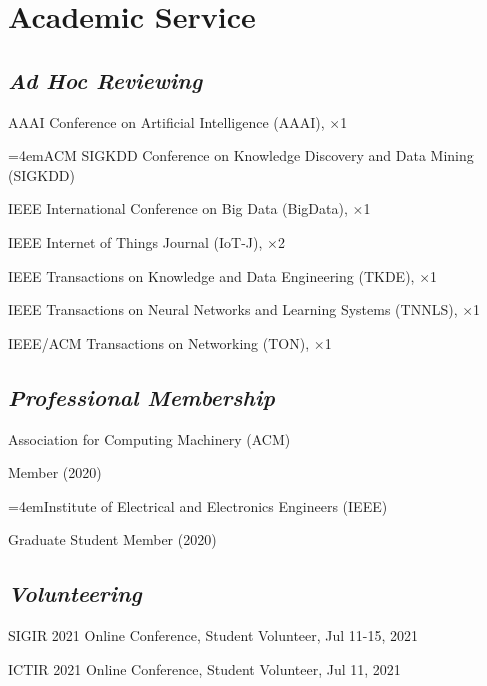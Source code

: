 
\vspace{-8pt}
\section*{Academic Service}
\vspace{-4pt}


\subsection*{\textnormal{\textit{Ad Hoc Reviewing}}}
\vspace{-4pt}
\indent

AAAI Conference on Artificial Intelligence (AAAI), $\times$1

\hangindent=4emACM SIGKDD Conference on Knowledge Discovery and Data Mining (SIGKDD)

IEEE International Conference on Big Data (BigData), $\times$1

IEEE Internet of Things Journal (IoT-J), $\times$2

IEEE Transactions on Knowledge and Data Engineering (TKDE), $\times$1

IEEE Transactions on Neural Networks and Learning Systems (TNNLS), $\times$1

IEEE/ACM Transactions on Networking (TON), $\times$1

\subsection*{\textnormal{\textit{Professional Membership}}}
\vspace{-4pt}
\indent 

Association for Computing Machinery (ACM)  

\hspace{2em}Member (2020)

\hangindent=4emInstitute of Electrical and Electronics Engineers (IEEE)

\hspace{2em}Graduate Student Member (2020)



\subsection*{\textnormal{\textit{Volunteering}}}
\vspace{-4pt}
\indent 

SIGIR 2021 Online Conference, Student Volunteer, Jul 11-15, 2021

ICTIR 2021 Online Conference, Student Volunteer, Jul 11, 2021